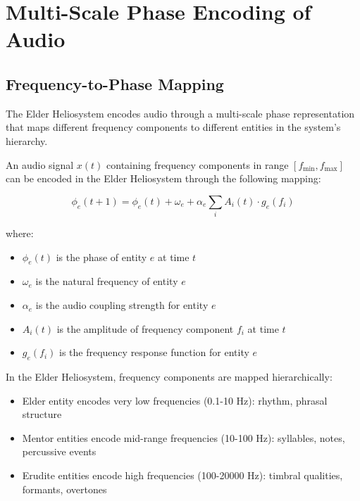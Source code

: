 \section{Multi-Scale Phase Encoding of Audio}

\subsection{Frequency-to-Phase Mapping}

The Elder Heliosystem encodes audio through a multi-scale phase representation that maps different frequency components to different entities in the system's hierarchy.

\begin{theorem}
An audio signal $x(t)$ containing frequency components in range $[f_{\min}, f_{\max}]$ can be encoded in the Elder Heliosystem through the following mapping:

\begin{equation}
\phi_e(t+1) = \phi_e(t) + \omega_e + \alpha_e \sum_{i} A_i(t) \cdot g_e(f_i)
\end{equation}

where:
\begin{itemize}
    \item $\phi_e(t)$ is the phase of entity $e$ at time $t$
    \item $\omega_e$ is the natural frequency of entity $e$
    \item $\alpha_e$ is the audio coupling strength for entity $e$
    \item $A_i(t)$ is the amplitude of frequency component $f_i$ at time $t$
    \item $g_e(f_i)$ is the frequency response function for entity $e$
\end{itemize}
\end{theorem}

\begin{corollary}
In the Elder Heliosystem, frequency components are mapped hierarchically:
\begin{itemize}
    \item Elder entity encodes very low frequencies (0.1-10 Hz): rhythm, phrasal structure
    \item Mentor entities encode mid-range frequencies (10-100 Hz): syllables, notes, percussive events
    \item Erudite entities encode high frequencies (100-20000 Hz): timbral qualities, formants, overtones
\end{itemize}
\end{corollary}

